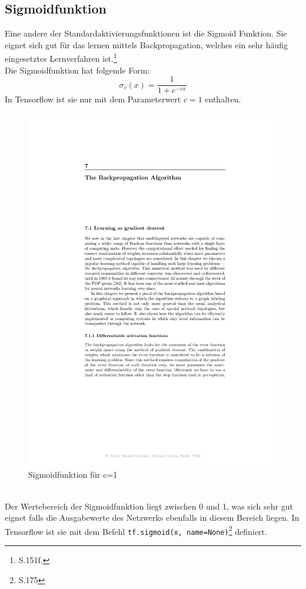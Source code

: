 \subsection{Sigmoidfunktion}
Eine andere der Standardaktivierungsfunktionen ist die Sigmoid Funktion. Sie eignet sich gut für das lernen mittels Backpropagation, welches ein sehr häufig eingesetztes Lernverfahren ist.\footnote{\cite{Rojas1996} S.151f.}\\
Die Sigmoidfunktion hat folgende Form:\cite{Rojas1996}
\begin{equation}
\sigma_c(x)=\frac{1}{1+e^{-cx}}
\end{equation}
In Tensorflow ist sie nur mit dem Parameterwert $c=1$ enthalten.
\begin{figure}[!htp]
	\centering
	\includegraphics[page=2,trim = 6cm 14.2cm 5cm 11cm,clip=true,scale=1.1]{images/BackPropRojas.pdf}
	\caption{Sigmoidfunktion für c=1 \cite{Rojas1996}}
\end{figure}\\
Der Wertebereich der Sigmoidfunktion liegt zwischen 0 und 1, was sich sehr gut eignet falls die Ausgabewerte des Netzwerks ebenfalls in diesem Bereich liegen. In Tensorflow ist sie mit dem Befehl \lstinline$tf.sigmoid(x, name=None)$\footnote{\cite{building}S.175}
definiert.
